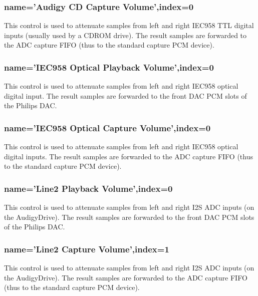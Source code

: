 \documentclass[a4paper,8pt,english]{sphinxmanual}
\begin{document}
\subsubsection{name='Audigy CD Capture Volume',index=0}
\label{sound/cards/audigy-mixer:name-audigy-cd-capture-volume-index-0}
This control is used to attenuate samples from left and right IEC958 TTL
digital inputs (usually used by a CDROM drive). The result samples are
forwarded to the ADC capture FIFO (thus to the standard capture PCM device).


\subsubsection{name='IEC958 Optical Playback Volume',index=0}
\label{sound/cards/audigy-mixer:name-iec958-optical-playback-volume-index-0}
This control is used to attenuate samples from left and right IEC958 optical
digital input. The result samples are forwarded to the front DAC PCM slots
of the Philips DAC.


\subsubsection{name='IEC958 Optical Capture Volume',index=0}
\label{sound/cards/audigy-mixer:name-iec958-optical-capture-volume-index-0}
This control is used to attenuate samples from left and right IEC958 optical
digital inputs. The result samples are forwarded to the ADC capture FIFO
(thus to the standard capture PCM device).


\subsubsection{name='Line2 Playback Volume',index=0}
\label{sound/cards/audigy-mixer:name-line2-playback-volume-index-0}
This control is used to attenuate samples from left and right I2S ADC
inputs (on the AudigyDrive). The result samples are forwarded to the front
DAC PCM slots of the Philips DAC.


\subsubsection{name='Line2 Capture Volume',index=1}
\label{sound/cards/audigy-mixer:name-line2-capture-volume-index-1}
This control is used to attenuate samples from left and right I2S ADC
inputs (on the AudigyDrive). The result samples are forwarded to the ADC
capture FIFO (thus to the standard capture PCM device).
\end{document}
